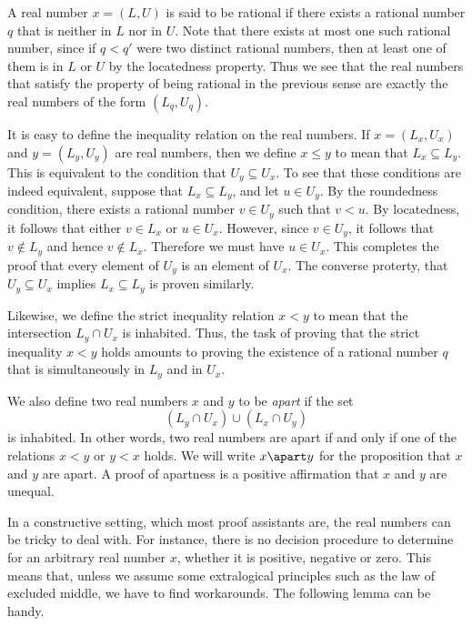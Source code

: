 A real number $x=(L,U)$ is said to be rational if there exists a rational number $q$ that is neither in $L$ nor in $U$. Note that there exists at most one such rational number, since if $q<q'$ were two distinct rational numbers, then at least one of them is in $L$ or $U$ by the locatedness property. Thus we see that the real numbers that satisfy the property of being rational in the previous sense are exactly the real numbers of the form $(L_q,U_q)$.

It is easy to define the inequality relation on the real numbers. If $x=(L_x,U_x)$ and $y=(L_y,U_y)$ are real numbers, then we define $x \leq y$ to mean that $L_x\subseteq L_y$. This is equivalent to the condition that $U_y\subseteq U_x$. To see that these conditions are indeed equivalent, suppose that $L_x\subseteq L_y$, and let $u\in U_y$. By the roundedness condition, there exists a rational number $v\in U_y$ such that $v<u$. By locatedness, it follows that either $v\in L_x$ or $u\in U_x$. However, since $v\in U_y$, it follows that $v\notin L_y$ and hence $v\notin L_x$. Therefore we must have $u\in U_x$. This completes the proof that every element of $U_y$ is an element of $U_x$. The converse proterty, that $U_y\subseteq U_x$ implies $L_x\subseteq L_y$ is proven similarly.

Likewise, we define the strict inequality relation $x<y$ to mean that the intersection $L_y\cap U_x$ is inhabited. Thus, the task of proving that the strict inequality $x<y$ holds amounts to proving the existence of a rational number $q$ that is simultaneously in $L_y$ and in $U_x$.

We also define two real numbers $x$ and $y$ to be \emph{apart} if the set
\begin{equation*}
  (L_y\cap U_x)\cup (L_x\cap U_y)
\end{equation*}
is inhabited. In other words, two real numbers are apart if and only if one of the relations $x<y$ or $y<x$ holds. We will write $x\apart y$ for the proposition that $x$ and $y$ are apart. A proof of apartness is a positive affirmation that $x$ and $y$ are unequal.

In a constructive setting, which most proof assistants are, the real numbers can be tricky to deal with. For instance, there is no decision procedure to determine for an arbitrary real number $x$, whether it is positive, negative or zero. This means that, unless we assume some extralogical principles such as the law of excluded middle, we have to find workarounds. The following lemma can be handy.

